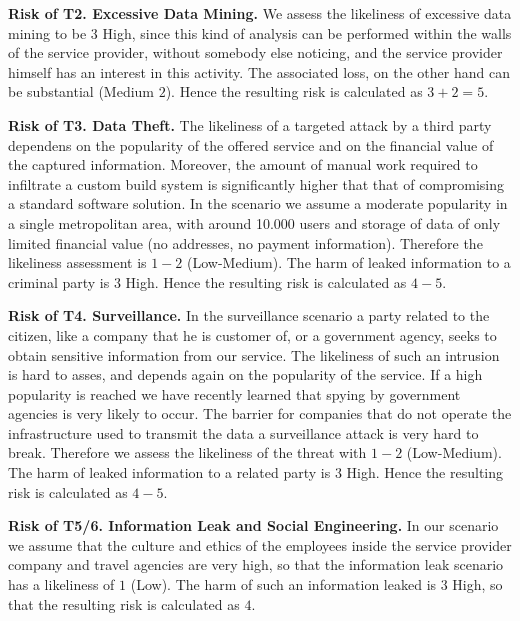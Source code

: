 \documentclass[runningheads,a4paper]{llncs}
\begin{document}
\textbf{Risk of T2. Excessive Data Mining.}
We assess the likeliness of excessive data mining to be $3$ High, since
this kind of analysis can be performed within the walls of the service
provider, without somebody else noticing, and the service provider himself
has an interest in this activity. The associated loss, on the other hand can be substantial (Medium $2$). Hence the resulting risk is calculated as $3+2 = 5$.

\textbf{Risk of T3. Data Theft.}
The likeliness of a targeted attack by a third party dependens on
the popularity of the offered service and on the financial value of the
captured information. Moreover, the amount of manual work required to
infiltrate a custom build system is significantly higher that that of
compromising a standard software solution. In the scenario we assume a
moderate popularity in a single metropolitan area, with around 10.000
users and storage of data of only limited financial value (no
addresses, no payment information). Therefore the likeliness
assessment is $1-2$ (Low-Medium). The harm of leaked information to a criminal party is $3$ High. Hence the resulting risk is calculated as $4-5$.

\textbf{Risk of T4. Surveillance.}  In the surveillance scenario a party
related to the citizen, like a company that he is customer of, or a
government agency, seeks to obtain sensitive information from our
service. The likeliness of such an intrusion is hard to asses, and depends
again on the popularity of the service. If a high popularity is
reached we have recently learned that spying by government agencies is
very likely to occur. The barrier for companies that do not operate
the infrastructure used to transmit the data a surveillance attack is very 
hard to break. Therefore we assess the likeliness of
the threat with $1-2$ (Low-Medium). The harm of leaked information to a related party is $3$ High. Hence the resulting risk is calculated as $4-5$.

\textbf{Risk of T5/6. Information Leak and Social Engineering.} In our scenario we assume that the culture and ethics of the employees inside the
service provider company and travel agencies are very high, so that
the information leak scenario has a likeliness of $1$ (Low). The harm of such an information leaked is $3$ High, so that the
resulting risk is calculated as $4$.
\end{document}

